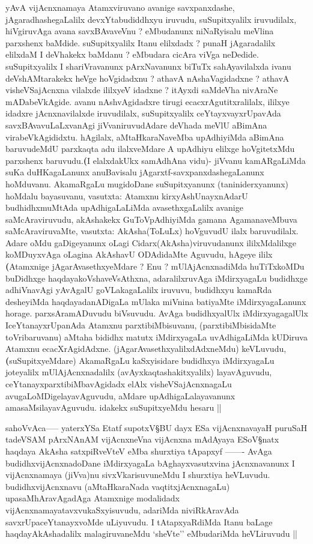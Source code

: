 \begin{artha}
yAvA vijAcnxnamaya Atamxviruvano avanige savxpanxdashe,
jAgaradhashegaLalilx devxYtabudiddhxyu iruvudu, suSupitxyalilx
iruvudilalx, hiVgiruvAga avana savxBAvaveVnu ? eMbudanunx niNaRyisalu
meVlina parxshenx baMdide. suSupitxyalilx Itanu elilxdadx ? punaH
jAgaradalilx elilxdaM I deVhakekx baMdanu ? eMbudara cicAra viVga
neDedide. suSupitxyalilx I shariVravanunx pArxNavanunx biTuTx
sahAyavilalxda ivanu deVshAMtarakekx heVge hoVgidadxnu ? athavA
nAshaVagidadxne ? athavA visheVSajAcnxna vilalxde ililxyeV idadxne ?
itAyxdi saMdeVha nivAraNe mADabeVkAgide. avanu nAshvAgidadxre tirugi
ecacxrAgutitxralilalx, ililxye idadxre jAcnxnavilalxde iruvudilalx,
suSupitxyalilx ceYtayxvayxrUpavAda savxBAvavuLaLxvanAgi
jiVvaniruvudAdare deVhada meVlU aBimAna virabeVkAgididxtu. hAgilalx,
aMtaHkaraNaveMba upAdhiyiMda aBimAna baruvudeMdU parxkaqta adu
ilalxveMdare  A upAdhiyu elilxge hoVgitetxMdu parxshenx
baruvudu.\textbf(I elalxdakUkx samAdhAna vidu)- jiVvanu kamARgaLiMda
suKa duHKagaLanunx anuBavisalu jAgarxtf-savxpanxdashegaLanunx
hoMduvanu. AkamaRgaLu mugidoDane suSupitxyanunx (taniniderxyanunx)
hoMdalu bayasuvanu, vasutxta: Atamxnu kirxyAshUnayxnAdarU
budhidhxmuMtAda upAdhigaLaLiMda avasethxgaLalilx avanige
saMcAraviruvudu, akAshakekx GuToVpAdhiyiMda gamana AgamanaveMbuva
saMcAraviruvaMte, vasutxta: AkAsha(ToLuLx) hoVguvudU ilalx
baruvudilalx. Adare oMdu gaDigeyanunx oLagi Cidarx(AkAsha)viruvudanunx
ililxMdalilxge koMDuyxvAga oLagina AkAshavU ODAdidaMte Aguvudu, hAgeye
ililx \textbf(Atamxnige jAgarAvasethxyeMdare ? Enu ? mUlAjAcnxnadiMda
huTiTxkoMDu buDidhxge haqdayakoVshaveVsAthxna, adaralilxruvAga
iMdirxyagaLu budidhxge adhiVnavAgi yAvAgalU goVLakagaLalilx iruvuvu,
budidhxyu kamaRda desheyiMda haqdayadanADigaLa mUlaka miVnina
batiyaMte iMdirxyagaLanunx horage. parxsAramADuvudu biVsuvudu. AvAga
budidhxyalUlx iMdirxyagagalUlx IceYtanayxrUpanAda Atamxnu
parxtibiMbisuvanu, (parxtibiMbisidaMte toVribaruvanu) aMtaha bididhx
matutx iMdirxyagaLa uvAdhigaLiMda kUDiruva Atamxnu
ecacXrAgidAdxne. (jAgarAvasethxyalilxdAdxneMdu) keVLuvudu,
\textbf(suSupitxyeMdare) AkamaRgaLu kaSxyisidare budidhxya
iMdirxyagaLu joteyalilx mUlAjAcnxnadalilx (avAyxkaqtashakitxyalilx)
layavAguvudu, ceYtanayxparxtibiMbavAgidadx elAlx visheVSajAcnxnagaLu
avugaLoMDigelayavAguvudu, aMdare upAdhigaLalayavanunx
amasaMsilayavAguvudu. idakekx suSupitxyeMdu hesaru || 
\end{artha}

\begin{artha}
sahoVvAca----- yaterxYSa Etatf supotxV\S BU dayx ESa vijAcnxnavayaH
puruSaH tadeVSAM pArxNAnAM vijAcnxneVna vijAcnxna mAdAyaya ESoV\S natx
haqdaya AkAsha satxpiRveVteV  eMba shurxtiya tApapxyf ------- AvAga
budidhxvijAcnxnadoDane iMdirxyagaLa bAghayxvasutxvina jAcnxnavanunx I
vijAcnxnamaya (jiVva)nu sivxVkarisuvuneMdu I shurxtiya
heVLuvudu. budidhxvijAcnxnavu (aMtaHkaraNada vaqtitxjAcnxnagaLu)
upasaMhAravAgadAga Atamxnige modalidadx
vijAcnxnamayatavxvukaSxyisuvudu, adariMda niviRkAravAda
savxrUpaceYtanayxvoMde uLiyuvudu. I tAtapxyaRdiMda Itanu baLage
haqdayAkAshadalilx malagiruvaneMdu `sheVte'' eMbudariMda heVLiruvudu ||
\end{artha}

